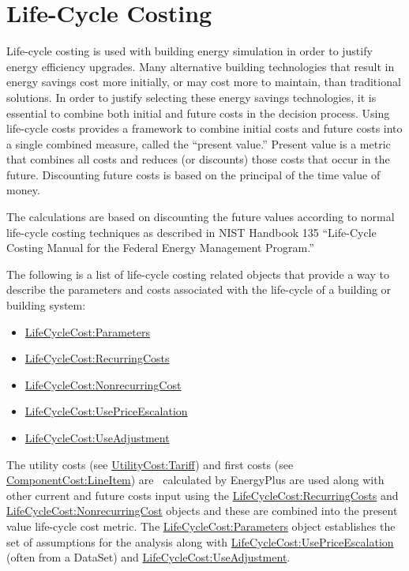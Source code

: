 \section{Life-Cycle Costing}\label{life-cycle-costing}

Life-cycle costing is used with building energy simulation in order to justify energy efficiency upgrades. Many alternative building technologies that result in energy savings cost more initially, or may cost more to maintain, than traditional solutions. In order to justify selecting these energy savings technologies, it is essential to combine both initial and future costs in the decision process. Using life-cycle costs provides a framework to combine initial costs and future costs into a single combined measure, called the ``present value.'' Present value is a metric that combines all costs and reduces (or discounts) those costs that occur in the future. Discounting future costs is based on the principal of the time value of money.

The calculations are based on discounting the future values according to normal life-cycle costing techniques as described in NIST Handbook 135 ``Life-Cycle Costing Manual for the Federal Energy Management Program.''

The following is a list of life-cycle costing related objects that provide a way to describe the parameters and costs associated with the life-cycle of a building or building system:

\begin{itemize}
\item
  \hyperref[lifecyclecostparameters]{LifeCycleCost:Parameters}
\item
  \hyperref[lifecyclecostrecurringcosts]{LifeCycleCost:RecurringCosts}
\item
  \hyperref[lifecyclecostnonrecurringcost]{LifeCycleCost:NonrecurringCost}
\item
  \hyperref[lifecyclecostusepriceescalation]{LifeCycleCost:UsePriceEscalation}
\item
  \hyperref[lifecyclecostuseadjustment]{LifeCycleCost:UseAdjustment}
\end{itemize}

The utility costs (see \hyperref[utilitycosttariff]{UtilityCost:Tariff}) and first costs (see \hyperref[componentcostlineitem]{ComponentCost:LineItem}) are~ calculated by EnergyPlus are used along with other current and future costs input using the \hyperref[lifecyclecostrecurringcosts]{LifeCycleCost:RecurringCosts} and \hyperref[lifecyclecostnonrecurringcost]{LifeCycleCost:NonrecurringCost} objects and these are combined into the present value life-cycle cost metric. The \hyperref[lifecyclecostparameters]{LifeCycleCost:Parameters} object establishes the set of assumptions for the analysis along with \hyperref[lifecyclecostusepriceescalation]{LifeCycleCost:UsePriceEscalation} (often from a DataSet) and \hyperref[lifecyclecostuseadjustment]{LifeCycleCost:UseAdjustment}.

